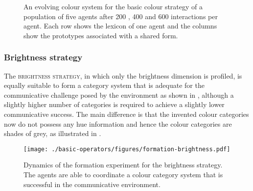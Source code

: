 \begin{figure}[htbp]
\centering
{}
\caption[An evolving colour system for the basic colour strategy]{An
  evolving colour system for the basic colour strategy of a
  population of five agents after 200
  , 400
   and 600
   interactions per agent. Each
  row shows the lexicon of one agent and the columns show the
  prototypes associated with a shared form.}
\label{f:formation-full-lexicon}
\end{figure}

\subsubsection{Brightness strategy}

The \textsc{brightness strategy}, in which only the brightness dimension
is profiled, is equally suitable to form a category system that is
adequate for the communicative challenge posed by the environment as
shown in , although a
slightly higher number of categories is required to achieve a slightly
lower communicative success. The main difference is that the invented
colour categories now do not possess any hue information and hence the
colour categories are shades of grey, as illustrated in .

\begin{figure}[p]
  \begin{center}
    \texttt{[image: ./basic-operators/figures/formation-brightness.pdf]}
    \caption[Dynamics of the formation experiment for the brightness
    strategy]{Dynamics of the formation experiment for the brightness
      strategy. The agents are able to coordinate a colour category
      system that is successful in the communicative environment.}
    \label{f:formation-brightness-dynamics}
  \end{center}
\end{figure}

